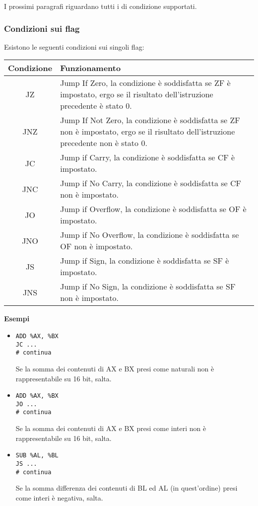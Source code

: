 \documentclass[a4paper,11pt]{article}
\begin{document}
I prossimi paragrafi riguardano tutti i di condizione supportati.

\subsubsection{Condizioni sui flag}
Esistono le seguenti condizioni sui singoli flag:

\begin{table}[h!]
	\center {}
	\begin{tabular} { c  p{10cm} }
		\bfseries Condizione & \bfseries Funzionamento \\
		\hline 
		JZ & Jump If Zero, la condizione è soddisfatta se ZF è impostato, ergo se il risultato dell'istruzione precedente è stato 0. \\ 
		JNZ & Jump If Not Zero, la condizione è soddisfatta se ZF non è impostato, ergo se il risultato dell'istruzione precedente non è stato 0. \\ 
		JC & Jump if Carry, la condizione è soddisfatta se CF è impostato. \\
		JNC & Jump if No Carry, la condizione è soddisfatta se CF non è impostato. \\ 
		JO & Jump if Overflow, la condizione è soddisfatta se OF è impostato. \\
		JNO & Jump if No Overflow, la condizione è soddisfatta se OF non è impostato. \\ 
		JS & Jump if Sign, la condizione è soddisfatta se SF è impostato. \\
		JNS & Jump if No Sign, la condizione è soddisfatta se SF non è impostato. \\ 
	\end{tabular}
\end{table}

\par\medskip
\noindent
\textbf{\textsf{Esempi}} \\
\begin{itemize}
	\item 
\begin{lstlisting}[language=assembler,style=codestyle]	
ADD %AX, %BX
JC ...
# continua
\end{lstlisting}
Se la somma dei contenuti di AX e BX presi come naturali non è rappresentabile su 16 bit, salta.

	\item 
\begin{lstlisting}[language=assembler,style=codestyle]	
ADD %AX, %BX
JO ...
# continua
\end{lstlisting}
Se la somma dei contenuti di AX e BX presi come interi non è rappresentabile su 16 bit, salta.

	\item 
\begin{lstlisting}[language=assembler,style=codestyle]	
SUB %AL, %BL
JS ...
# continua
\end{lstlisting}
Se la somma differenza dei contenuti di BL ed AL (in quest'ordine) presi come interi è negativa, salta.
\end{itemize}
\end{document}
